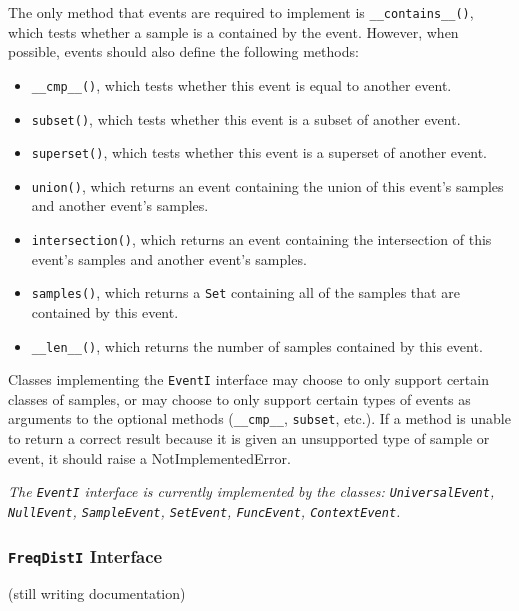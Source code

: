 \documentclass{article}
\begin{document}
    The only method that events are required to implement is
    \texttt{\_\_contains\_\_()}, which tests whether a sample is a
    contained by the event.  However, when possible, events should
    also define the following methods:
    \begin{itemize}
      \item \texttt{\_\_cmp\_\_()}, which tests whether this event is
           equal to another event.
      \item \texttt{subset()}, which tests whether this event is a
           subset of another event.
      \item \texttt{superset()}, which tests whether this event is
           a superset of another event.
      \item \texttt{union()}, which returns an event containing the
           union of this event's samples and another event's samples.
      \item \texttt{intersection()}, which returns an event
           containing the intersection of this event's samples and
           another event's samples.
      \item \texttt{samples()}, which returns a \texttt{Set}
           containing all of the samples that are contained by this
           event. 
      \item \texttt{\_\_len\_\_()}, which returns the number of samples 
           contained by this event.
    \end{itemize}
    
    Classes implementing the \texttt{EventI} interface may choose
    to only support certain classes of samples, or may choose to only
    support certain types of events as arguments to the optional
    methods (\texttt{\_\_cmp\_\_}, \texttt{subset}, etc.).  If a
    method is unable to return a correct result because it is given an 
    unsupported type of sample or event, it should raise a
    NotImplementedError.

\vspace{2mm}\noindent
\textit{The \texttt{EventI} interface is currently implemented by the
classes: \texttt{UniversalEvent}, \texttt{NullEvent},
\texttt{SampleEvent}, \texttt{SetEvent}, \texttt{FuncEvent},
\texttt{ContextEvent}.}

\subsubsection{\texttt{FreqDistI} Interface}

(still writing documentation)
\end{document}
